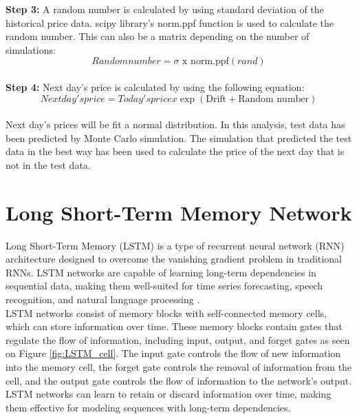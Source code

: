 \documentclass[12pt, a4paper]{article}
\begin{document}
\textbf{Step 3:} A random number is calculated by using standard deviation of the historical price data.  scipy library's norm.ppf function is used to calculate the random number.  This can also be a matrix depending on the number of simulations:\\

\begin{equation} \label{eq3}
Random number = \sigma \text{ x } \text{norm.ppf}(rand)
\end{equation}\\

\textbf{Step 4:} Next day's price is calculated by using the following equation:\\

\begin{equation} \label{eq4}
Next day's price = Today's price x \exp\left(\text{Drift} + \text{Random number}\right)
\end{equation}\\

Next day's prices will be fit a normal distribution.  In this analysis, test data has been predicted by Monte Carlo simulation.  The simulation that predicted the test data in the best way has been used to calculate the price of the next day that is not in the test data.\\



\section{Long Short-Term Memory Network}
Long Short-Term Memory (LSTM) is a type of recurrent neural network (RNN) architecture designed to overcome the vanishing gradient problem in traditional RNNs. LSTM networks are capable of learning long-term dependencies in sequential data, making them well-suited for time series forecasting, speech recognition, and natural language processing \cite{7}.\\

LSTM networks consist of memory blocks with self-connected memory cells, which can store information over time. These memory blocks contain gates that regulate the flow of information, including input, output, and forget gates as seen on Figure \ref{fig:LSTM_cell}. The input gate controls the flow of new information into the memory cell, the forget gate controls the removal of information from the cell, and the output gate controls the flow of information to the network's output. LSTM networks can learn to retain or discard information over time, making them effective for modeling sequences with long-term dependencies\cite{7}.\\
\end{document}
